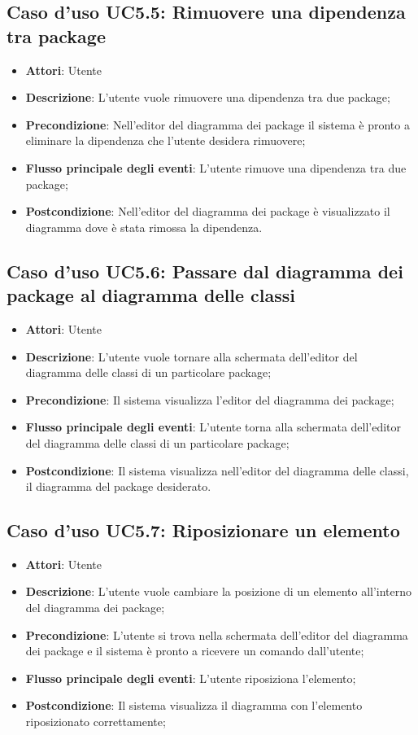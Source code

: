 \documentclass[../AnalisiDeiRequisiti.tex]{subfiles}
\begin{document}
			\subsection{Caso d'uso UC5.5: Rimuovere una dipendenza tra package}
			\begin{itemize}
				\item \textbf{Attori}: Utente
				\item \textbf{Descrizione}: L'utente vuole rimuovere una dipendenza tra due package;
				\item \textbf{Precondizione}: Nell'editor del diagramma dei package il sistema è pronto a eliminare la dipendenza che l'utente desidera rimuovere;
				\item \textbf{Flusso principale degli eventi}: L'utente rimuove una dipendenza tra due package;
				\item \textbf{Postcondizione}: Nell'editor del diagramma dei package è visualizzato il diagramma dove è stata rimossa la dipendenza.
			\end{itemize}
			\subsection{Caso d'uso UC5.6: Passare dal diagramma dei package al diagramma delle classi}
			\begin{itemize}
				\item \textbf{Attori}: Utente
				\item \textbf{Descrizione}: L'utente vuole tornare alla schermata dell'editor del diagramma delle classi di un particolare package;
				\item \textbf{Precondizione}: Il sistema visualizza l'editor del diagramma dei package;
				\item \textbf{Flusso principale degli eventi}: L'utente torna alla schermata dell'editor del diagramma delle classi di un particolare package;
				\item \textbf{Postcondizione}: Il sistema visualizza nell'editor del diagramma delle classi, il diagramma del package desiderato.
			\end{itemize}
			\subsection{Caso d'uso UC5.7: Riposizionare un elemento}
			\begin{itemize}
				\item \textbf{Attori}: Utente
				\item \textbf{Descrizione}: L'utente vuole cambiare la posizione di un elemento all'interno del diagramma dei package;
				\item \textbf{Precondizione}: L'utente si trova nella schermata dell'editor del diagramma dei package e il sistema è pronto a ricevere un comando dall'utente;
				\item \textbf{Flusso principale degli eventi}: L'utente riposiziona l'elemento;
				\item \textbf{Postcondizione}: Il sistema visualizza il diagramma con l'elemento riposizionato correttamente;
			\end{itemize}
\end{document}
